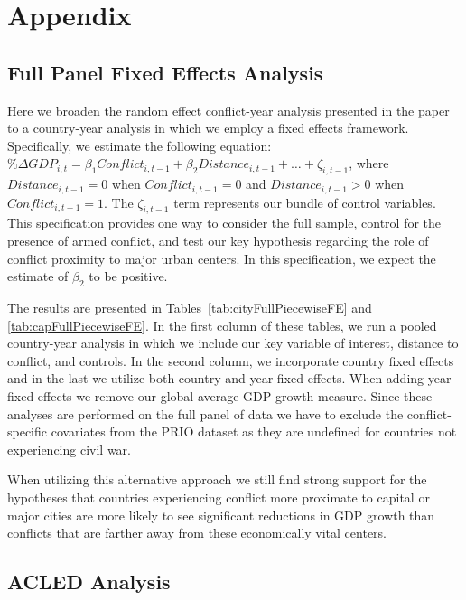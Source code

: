 
\newpage
\section{Appendix}
\label{appendix}

\subsection{Full Panel Fixed Effects Analysis}

Here we broaden the random effect conflict-year analysis presented in the paper to a country-year analysis in which we employ a fixed effects framework. Specifically, we estimate the following equation: $\% \Delta GDP_{i,t} = \beta_{1}Conflict_{i,t-1} + \beta_{2}Distance_{i,t-1}+\ldots+\zeta_{i,t-1}$, where $Distance_{i,t-1}=0$ when $Conflict_{i,t-1}=0$ and $Distance_{i,t-1}>0$ when $Conflict_{i,t-1}=1$. The $\zeta_{i,t-1}$ term represents our bundle of control variables. This specification provides one way to consider the full sample, control for the presence of armed conflict, and test our key hypothesis regarding the role of conflict proximity to major urban centers. In this specification, we expect the estimate of $\beta_{2}$ to be positive.

The results are presented in Tables~\ref{tab:cityFullPiecewiseFE} and \ref{tab:capFullPiecewiseFE}. In the first column of these tables, we run a pooled country-year analysis in which we include our key variable of interest, distance to conflict, and controls. In the second column, we incorporate country fixed effects and in the last we utilize both country and year fixed effects. When adding year fixed effects we remove our global average GDP growth measure. Since these analyses are performed on the full panel of data we have to exclude the conflict-specific covariates from the PRIO dataset as they are undefined for countries not experiencing civil war. 

When utilizing this alternative approach we still find strong support for the hypotheses that countries experiencing conflict more proximate to capital or major cities are more likely to see significant reductions in GDP growth than conflicts that are farther away from these economically vital centers.


\FloatBarrier


\FloatBarrier

\newpage
\subsection{ACLED Analysis}
\label{acled}

